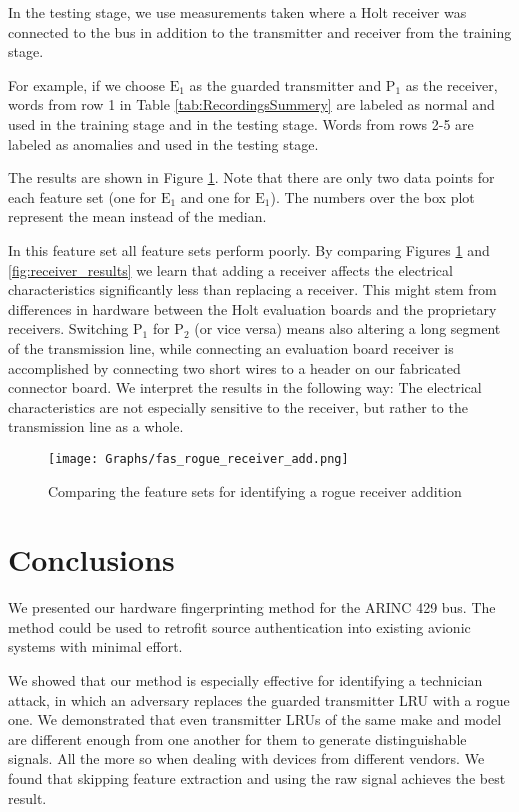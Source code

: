\documentclass[conference]{IEEEtran}
\begin{document}
  In the testing stage, we use measurements taken where a Holt receiver was connected to the bus in addition to the transmitter and receiver from the training stage.
  
  For example, if we choose \(\text{E}_1\) as the guarded transmitter and \(\text{P}_1\) as the receiver, words from row 1 in Table \ref{tab:RecordingsSummery} are labeled as normal and used in the training stage and in the testing stage. Words from rows 2-5 are labeled as anomalies and used in the testing stage.
  
  The results are shown in Figure \ref{fig:load_results}. Note that there are only two data points for each feature set (one for \(\text{E}_1\) and one for \(\text{E}_1\)). The numbers over the box plot represent the mean instead of the median.
  
  In this feature set all feature sets perform poorly. By comparing Figures \ref{fig:load_results} and \ref{fig:receiver_results} we learn that adding a receiver affects the electrical characteristics significantly less than replacing a receiver. This might stem from differences in hardware between the Holt evaluation boards and the proprietary receivers. Switching \(\text{P}_1\) for \(\text{P}_2\) (or vice versa) means also altering a long segment of the transmission line, while connecting an evaluation board receiver is accomplished by connecting two short wires to a header on our fabricated connector board. We interpret the results in the following way: The electrical characteristics are not especially sensitive to the receiver, but rather to the transmission line as a whole.
  
  \begin{figure}[t]
    \centering
    \texttt{[image: Graphs/fas\_rogue\_receiver\_add.png]}
    \caption{Comparing the feature sets for identifying a rogue receiver addition}
    \label{fig:load_results}
  \end{figure}

\section{Conclusions}
  We presented our hardware fingerprinting method for the ARINC 429 bus. The method could be used to retrofit source authentication into existing avionic systems with minimal effort.
  
  We showed that our method is especially effective for identifying a technician attack, in which an adversary replaces the guarded transmitter LRU with a rogue one. We demonstrated that even transmitter LRUs of the same make and model are different enough from one another for them to generate distinguishable signals. All the more so when dealing with devices from different vendors. We found that skipping feature extraction and using the raw signal achieves the best result.
  
\end{document}
